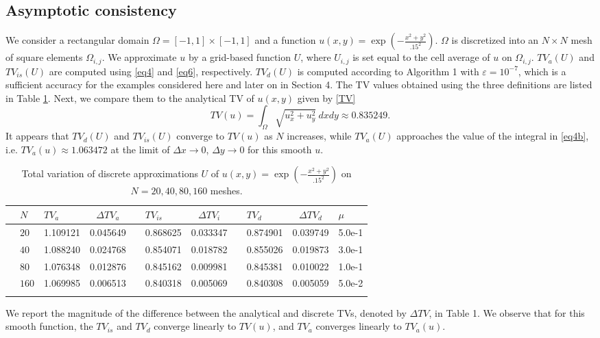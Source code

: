 \documentclass[reqno,a4paper,12pt]{amsart}
\begin{document}
\subsection{Asymptotic consistency}
 We consider a rectangular domain $\Omega = [-1,1] \times [-1,1]$ and a function $u(x,y) = \exp{\left(-\frac{x^2+y^2}{.15^2}\right)}$.
 $\Omega$ is discretized into an $N \times N$ mesh of square elements  $\Omega_{i,j}$. We approximate $u$ by a grid-based function $U$, where $U_{i,j}$ is set equal to the cell average of $u$ on $\Omega_{i,j}$. $TV_a(U)$ and $TV_{is}(U)$ are computed using \eqref{eq4} and \eqref{eq6}, respectively.  $TV_d(U)$ is computed according to Algorithm 1 with  $\varepsilon = 10^{-7}$, which is a sufficient accuracy for the examples considered here and later on in Section 4. The TV values obtained using the three definitions are listed in Table \ref{table:5}. Next, we compare them to the analytical TV of $u(x,y)$ given by \eqref{TV} 
$$TV(u) = \int_{\Omega} \sqrt{u_x^2 + u_y^2} ~dx dy \approx 0.835249.$$ It appears that $TV_d(U)$ and $TV_{is}(U)$ converge to $TV(u)$ as $N$ increases, while $TV_a(U)$ approaches the value of the integral in \eqref{eq4b}, i.e. $TV_a(u) \approx 1.063472$
at the limit of $\Delta x \to 0$, $\Delta y \to 0$ for this smooth $u$. 
 

\begin{table}[htb!]\centering
\begin{tabular}{@{}cllcclcclcl@{}}\toprule
& $N$ & $TV_a$ & $\Delta TV_{a}$ && $TV_{is}$ & $\Delta TV_{i}$ && $TV_{d}$ & $\Delta TV_{d}$ & $\mu$ \\ \midrule
& $20$ & 1.109121 & 0.045649 && 0.868625 & 0.033347 && 0.874901 & 0.039749 & 5.0e-1\\
& $40$ & 1.088240 & 0.024768 && 0.854071 & 0.018782 && 0.855026 & 0.019873 & 3.0e-1\\
& $80$ & 1.076348 & 0.012876 && 0.845162 & 0.009981 && 0.845381 & 0.010022 & 1.0e-1\\
& $160$ & 1.069985 & 0.006513 && 0.840318 & 0.005069 && 0.840308 & 0.005059 & 5.0e-2\\
\bottomrule\\
\end{tabular}
\caption{Total variation of discrete approximations $U$ of $u(x,y) = \exp{\left(-\frac{x^2+y^2}{.15^2}\right)}$ on $N= 20, 40, 80, 160$ meshes. }
\label{table:5}
\end{table}

We report the magnitude of the difference between the analytical and discrete TVs, denoted by $\Delta TV$, in Table 1. We observe that for this smooth function, the $TV_{is}$ and $TV_d$ converge linearly to $TV(u)$, and $TV_a$ converges linearly to $TV_a(u)$. 
\end{document}
